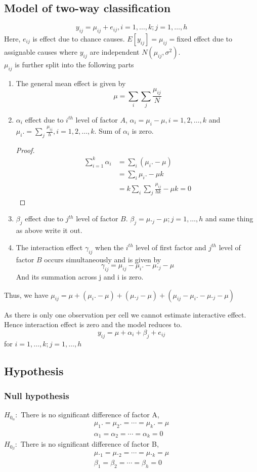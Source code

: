 \documentclass[oneside,11pt,pdftex]{book}%
\numberwithin{equation}{section}
\numberwithin{section}{chapter}
\numberwithin{equation}{chapter}
\begin{document}
\subsection{Model of two-way classification}
\[ y_{ij} = \mu_{ij}+e_{ij}, i=1,\dots,k; j=1,\dots,h\]
Here, $ e_{ij} $ is effect due to chance causes. $ E[y_{ij}] =\mu_{ij}=$fixed effect due to assignable causes where $ y_{ij} $ are independent $ N(\mu_{ij},\sigma^2) $. \\
$ \mu_{ij} $ is further split into the following parts 
\begin{enumerate}
	\item The general mean effect is given by \[ \mu=\sum_i \sum_j \frac{\mu_{ij}}{N} \]
	\item $ \alpha_i  $ effect due to $ i^{th} $ level of factor $ A $, $ \alpha_i=\mu_i-\mu, i=1,2,\dots, k$ and $ \mu_i.=\sum_j \frac{\mu_{ij}}{h}, i=1,2,\dots, k $. Sum of $ \alpha_i  $ is zero.
	\begin{proof}
		\begin{align*}
			\sum_{i=1}^k \alpha_i &= \sum_i (\mu_i.-\mu)\\
			&=\sum_i  \mu_i.-\mu k\\
			&=k\sum_i \sum_j \frac{\mu_{ij}}{hk}-\mu k =0
		\end{align*}
	\end{proof}
	\item $ \beta_j $ effect due to $ j^{th} $ level of factor $ B $. $ \beta_j=\mu._j-\mu; j=1,\dots,h $ and same thing as above write it out.
	\item The interaction effect $ \gamma_{ij} $ when the $ i^{th} $ level of first factor and $ j^{th} $ level of factor $ B $ occurs simultaneously and is given by 
	\[ \gamma_{ij}= \mu_{ij}-\mu_i.-\mu._j-\mu\]
	And its summation across j and i is zero.
\end{enumerate}
Thus, we have $ \mu_{ij} =\mu+(\mu_i.-\mu)+(\mu._j-\mu)+(\mu_{ij}-\mu_i.-\mu._j-\mu)$

As there is only one observation per cell we cannot estimate interactive effect. Hence interaction effect is zero and the model reduces to.
\[ y_{ij}=\mu+\alpha_i+\beta_j+e_{ij} \]
for $ i=1,\dots,k;j=1,\dots,h $

\subsection{Hypothesis}
\subsubsection{Null hypothesis}
$ H_{0_{\alpha}}: $ There is no significant difference of factor A,
\begin{align*}
	\mu_1.=\mu_2.=\cdots=\mu_k.=\mu\\
	\alpha_1=\alpha_2=\cdots=\alpha_k=0
\end{align*}
$ H_{0_{\beta}}: $ There is no significant difference of factor B,
\begin{align*}
	\mu._1=\mu._2=\cdots=\mu._k=\mu\\
	\beta_1=\beta_2=\cdots=\beta_h=0
\end{align*}
\end{document}
